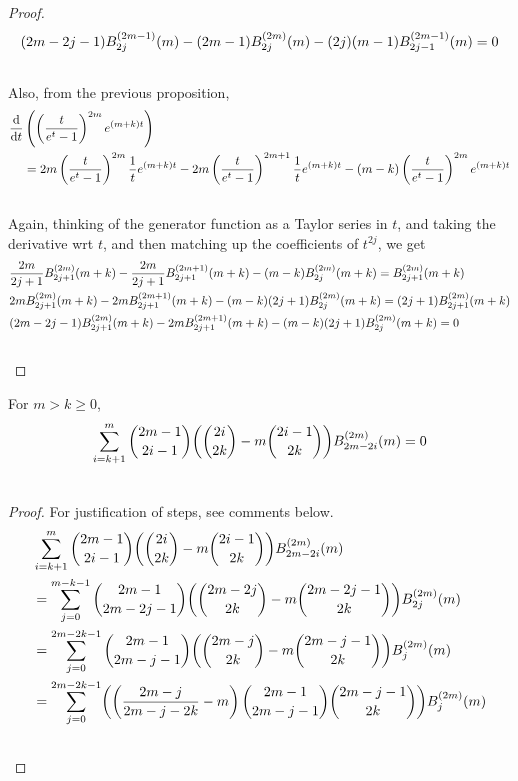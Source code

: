 \documentclass[fleqn,a4paper,9pt]{article}
\begin{document}
\begin{flushleft}
\begin{proof}
\begin{align}
&(2m-2j-1)B_{2j}^{(2m-1)}(m)-(2m-1)B_{2j}^{(2m)}(m)-(2j)(m-1)B_{2j-1}^{(2m-1)}(m)=0\\\notag
\end{align}
Also, from the previous proposition,
\begin{align}\notag
\frac{ \mathrm{  d  }   }{\mathrm{d}t }&\left(\left(\frac{t}{e^t-1}\right)^{2m} e^{(m+k)t}\right)\\\notag
&=2m\left(\frac{t}{e^t-1}\right)^{2m}\frac{1}{t}e^{(m+k)t}-2m\left(\frac{t}{e^t-1}\right)^{2m+1}\frac{1}{t}e^{(m+k)t} -(m-k)\left(\frac{t}{e^t-1}\right)^{2m}e^{(m+k)t}\\\notag
\end{align}
Again, thinking of the generator function as a Taylor series in $t$, and taking the derivative wrt $t$, and then matching up the coefficients of $t^{2j}$, we get
\begin{align}\notag
&\frac{2m}{2j+1}B_{2j+1}^{(2m)}(m+k)-\frac{2m}{2j+1}B_{2j+1}^{(2m+1)}(m+k)-(m-k) B_{2j}^{(2m)}(m+k)=B_{2j+1}^{(2m)}(m+k)\\\notag
&2mB_{2j+1}^{(2m)}(m+k)-2mB_{2j+1}^{(2m+1)}(m+k)-(m-k)(2j+1) B_{2j}^{(2m)}(m+k)=(2j+1)B_{2j+1}^{(2m)}(m+k)\\\notag
&(2m-2j-1)B_{2j+1}^{(2m)}(m+k)-2mB_{2j+1}^{(2m+1)}(m+k)-(m-k)(2j+1) B_{2j}^{(2m)}(m+k)=0\\\notag
\end{align}
\end{proof}
\begin{lemma}\label{coeffx}
For $m>k\ge 0$,
\begin{align}
\sum_{i=k+1}^m \binom{2m-1}{2i-1}\biggl(\binom{2i}{2k}-m\binom{2i-1}{2k}\biggr)B_{2m-2i}^{(2m)}(m)=0\\\notag
\end{align}
\end{lemma}
\begin{proof}
For justification of steps, see comments below.
\begin{align}
&\sum_{i=k+1}^m \binom{2m-1}{2i-1}\biggl(\binom{2i}{2k}-m\binom{2i-1}{2k}\biggr)B_{2m-2i}^{(2m)}(m)\\\notag
&=\sum_{j=0}^{m-k-1} \binom{2m-1}{2m-2j-1}\biggl(\binom{2m-2j}{2k}-m\binom{2m-2j-1}{2k}\biggr)B_{2j}^{(2m)}(m)\\\notag
&=\sum_{j=0}^{2m-2k-1} \binom{2m-1}{2m-j-1}\biggl(\binom{2m-j}{2k}-m\binom{2m-j-1}{2k}\biggr)B_{j}^{(2m)}(m)\\\notag
&=\sum_{j=0}^{2m-2k-1} \biggl(\left(\frac{2m-j}{2m-j-2k}-m\right)\binom{2m-1}{2m-j-1}\binom{2m-j-1}{2k}\biggr)B_{j}^{(2m)}(m)\\\notag

\end{align}
\end{proof}
\end{flushleft}
\end{document}
